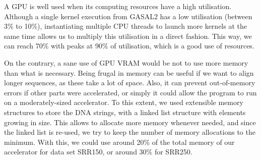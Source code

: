 A GPU is well used when its computing resources have a high utilisation. Although a single kernel execution from GASAL2 has a low utilisation (between 3\% to 10\%), instantiating multiple CPU threads to launch more kernels at the same time allows us to multiply this utilisation in a direct fashion. This way, we can reach 70\% with peaks at 90\% of utilisation, which is a good use of resources.

On the contrary, a sane use of GPU VRAM would be not to use more memory than what is necessary. Being frugal in memory can be useful if we want to align longer sequences, as these take a lot of space. Also, it can prevent out-of-memory errors if other parts were accelerated, or simply it could allow the program to run on a moderately-sized accelerator. To this extent, we used extensible memory structures to store the DNA strings, with a linked list structure with elements growing in size. This allows to allocate more memory whenever needed, and since the linked list is re-used, we try to keep the number of memory allocations to the minimum. With this, we could use around 20\% of the total memory of our accelerator for data set SRR150, or around 30\% for SRR250. 

